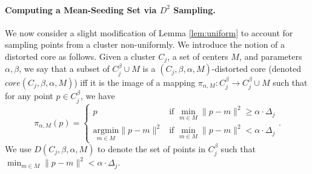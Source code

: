 \documentclass[11pt]{article}
\begin{document}
\paragraph{Computing a Mean-Seeding Set via $D^2$ Sampling.}

We now consider a slight modification of Lemma \ref{lem:uniform} to account for sampling points from a cluster non-uniformly. We introduce the notion of a distorted core as follows.
Given a cluster $C_j$, a set of centers $M$, and parameters $\alpha,\beta$, we say that a subset of $C_j^{\beta}\cup M$ is a $(C_j,\beta,\alpha,M)$-distorted core (denoted $core(C_j,\beta,\alpha,M)$) iff it is the image of a mapping $\pi_{\alpha,M}:C_j^\beta\rightarrow C_j^\beta\cup M$ such that for any point $p\in C_j^\beta$, we have
$$\pi_{\alpha,M}(p) = \begin{cases} p &\text{if }\min_{m\in M}\|p-m\|^2 \geq \alpha\cdot \Delta_j \\  \underset{m\in M}{\text{argmin}}\|p-m\|^2 & \text{if }\min_{m\in M}\|p-m\|^2 < \alpha\cdot \Delta_j\end{cases}.$$
We use $D(C_j,\beta,\alpha,M)$ to denote the set of points in $C_j^\beta$ such that $\min_{m\in M}\|p-m\|^2 < \alpha\cdot \Delta_j$.
\end{document}
